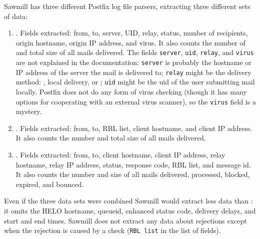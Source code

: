 Sawmill has three different Postfix log file parsers, extracting three
different sets of data:

\begin{enumerate}

    \item
        .
        Fields extracted: from, to, server, UID, relay, status, number of
        recipients, origin hostname, origin IP address, and virus.  It also
        counts the number of and total size of all mails delivered.  The
        fields \texttt{server}, \texttt{uid}, \texttt{relay}, and
        \texttt{virus} are not explained in the documentation:
        \texttt{server} is probably the hostname or IP address of the
        server the mail is delivered to; \texttt{relay} might be the
        delivery method: , local delivery, or ;
        \texttt{uid} might be the uid of the user submitting mail locally.
        Postfix does not do any form of virus checking (though it has many
        options for cooperating with an external virus scanner), so the
        \texttt{virus} field is a mystery.

    \item
        .
        Fields extracted: from, to, RBL list, client hostname, and client
        IP address.  It also counts the number and total size of all mails
        delivered.

    \item
        .
        Fields extracted: from, to, client hostname, client IP address,
        relay hostname, relay IP address, status, response code, RBL list,
        and message id.  It also counts the number and size of all mails
        delivered, processed, blocked, expired, and bounced.

\end{enumerate}

Even if the three data sets were combined Sawmill would extract less data
than \parsername{}: it omits the HELO hostname, queueid, enhanced status
code, delivery delays, and start and end times.  Sawmill does not extract
any data about rejections except when the rejection is caused by a
 check (\texttt{RBL list} in the list of fields).

